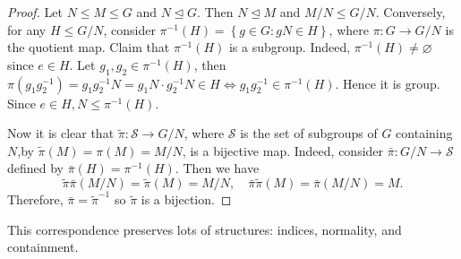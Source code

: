 \documentclass[10pt]{article}
\def\le{\leqslant}
\def\ltrigeq{\trianglelefteq}
\begin{document}
    \begin{proof}
        Let $ N \le M \le G $ and $ N \ltrigeq G $. Then $ N \ltrigeq M $ and $ M/N \le G/N $. Conversely, for any $ H\le G/N $, consider $ \pi^{-1}(H)=\left\{ g\in G: gN\in H\right\} $, where $ \pi: G\to G/N $ is the quotient map. Claim that $ \pi^{-1}(H) $ is a subgroup. Indeed, $\pi^{-1}(H)\neq \varnothing$ since $e\in H$. Let $ g_1,g_2\in \pi^{-1}(H) $, then $ \pi(g_1g_2^{-1})=g_1g_2^{-1}N=g_1N\cdot g_2^{-1}N\in H \Leftrightarrow g_1g_2^{-1}\in \pi^{-1}(H) $. Hence it is group. Since $ e\in H, N\le \pi^{-1}(H) $. 

        Now it is clear that $\tilde{\pi}:\mathcal{S}\to G/N$, where $\mathcal{S}$ is the set of subgroups of $G$ containing $N$,by $ \tilde{\pi}(M)=\pi(M)=M/N$, is a bijective map. Indeed, consider $ \bar{\pi}:G/N\to \mathcal{S} $ defined by $ \bar{\pi}(H)=\pi^{-1}(H) $. Then we have 
        \[
            \tilde{\pi}\bar{\pi}(M/N)=\tilde{\pi}(M)=M/N,\quad \bar{\pi}\tilde{\pi}(M)=\bar{\pi}(M/N)=M
        .\]
        Therefore, $ \bar{\pi}=\tilde{\pi}^{-1} $ so $ \tilde{\pi} $ is a bijection.
    \end{proof}
    \begin{remark}
        This correspondence preserves lots of structures: indices, normality, and containment.
    \end{remark}
    \newpage
\end{document}
